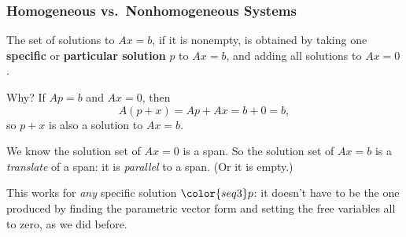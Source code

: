 
\begin{frame}
\frametitle{Homogeneous vs.\ Nonhomogeneous Systems}

\vskip-7mm\null
\begin{bluebox}{.8\textwidth}
  The set of solutions to $Ax=b$, if it is nonempty, is obtained by taking one
  \textbf{specific} or \textbf{particular solution} $p$ to $Ax=b$, and adding
  all solutions to $Ax=0$.
\end{bluebox}

  \pause
  \alert{Why?}  If $Ap = b$ and $Ax = 0$, then
  \[ A(p+x) = Ap + Ax = b + 0 = b, \]
  \pause
  so $p+x$ is also a solution to $Ax=b$.

  \pause\medskip
  We know the solution set of $Ax=0$ is a span.
  \pause
  So the solution set of $Ax=b$ is a \emph{translate} of a span: it is
  \emph{parallel} to a span.  \pause(Or it is empty.)

  \pause
\begin{center}
\quad
\begin{minipage}[c]{0.4\linewidth}
  This works for \emph{any} specific solution $\color{seq3}p$: it doesn't
  have to be the one produced by finding the parametric vector form and setting
  the free variables all to zero, as we did before.
\end{minipage}
\end{center}

\end{frame}



